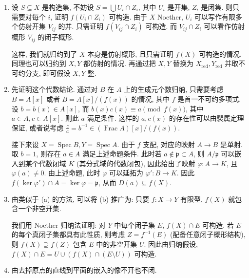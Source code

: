 \documentclass{article}
\theoremstyle{exercise}
\newenvironment{proofc}{\proof}{\endproof}
\def\gp{\mathfrak{p}}
\def\red{\mathrm{red}}
\def\Spec{\operatorname{Spec}}
\def\Frac{\operatorname{Frac}}
\begin{document}
\begin{proofc}
  \begin{enumerate}[label={(\alph*)}]
    \item 设 $S \subseteq X$ 是构造集,
          不妨设 $S = \bigcup U_i \cap Z_i$, 其中 $U_i$ 是开集, $Z_i$ 是闭集.
          则只需要对每个 $i$, 证明 $f(U_i \cap Z_i)$ 可构造.
          由于 $X$ Noether, $U_i$ 可以写作有限多个仿射开集 $V_{ij}$ 的并.
          只需证明 $f(V_{ij} \cap Z_i)$ 可构造.
          而 $V_{ij} \cap Z_i$ 可以看作仿射概形 $V_{ij}$ 的闭子概形.

          这样, 我们就归约到了 $X$ 本身是仿射概形, 且只需证明 $f(X)$ 可构造的情况.
          同理也可以归约到 $X, Y$ 都仿射的情况.
          再通过把 $X, Y$ 替换为 $X_{\red}, Y_{\red}$ 并取不可约分支, 即可假设 $X, Y$ 整.
    \item 先证明这个代数结论.
          通过对 $B$ 在 $A$ 上的生成元个数归纳,
          只需要考虑 $B = A[x]$ 或者 $B = A[x] / (f(x))$ 的情况,
          其中 $f$ 是首一不可约多项式.
          设 $b = b(x) \in A[x]$, 而 $b(x)c(x) \equiv a \pmod{f(x)}$,
          其中 $a \in A, c \in A[x]$. 则此 $a$ 满足条件.
          这样的 $a, c(x)$ 的存在性可以由裴属定理保证,
          或者说考虑 $\frac{c}{a} = b^{-1} \in (\Frac A)[x] / (f(x))$.

          接下来设 $X = \Spec B, Y = \Spec A$.
          由于 $f$ 支配, 对应的映射 $A \to B$ 是单射.
          取 $b = 1$, 则存在 $a \in A$ 满足上述命题条件.
          此时若 $a \notin \gp \subset A$, 则 $A / \gp$ 可以嵌入到某个代数闭域 $K$ (其分式域的代数闭包),
          因此给出了映射 $\varphi \colon A \to K$, 且 $\varphi(a) \neq 0$.
          由上述命题, 此时 $\varphi$ 可以延拓为 $\varphi' \colon B \to K$.
          因此 $f(\ker \varphi') \cap A = \ker \varphi = \gp$,
          从而 $D(a) \subseteq f(X)$.
    \item 由类似于 (a) 的方法, 可以将 (b) 推广为: 只要 $f \colon X \to Y$ 有限型,
          $f(X)$ 就包含一个非空开集.

          我们用 Noether 归纳法证明: 对 $Y$ 中每个闭子集 $E$, $f(X) \cap E$ 可构造.
          若 $E$ 的每个真闭子集都具有此性质, 则考虑 $Z = f^{-1}(E)$ (配备任意闭子概形结构),
          则 $f(X) \supseteq f(Z)$ 包含 $E$ 中的非空开集 $U$.
          因此由归纳假设, $f(X) \cap E = U \cup (f(X) \cap (E \setminus U))$ 可构造.
    \item 由去掉原点的直线到平面的嵌入的像不开也不闭.
          \qedhere
  \end{enumerate}
\end{proofc}
\end{document}
